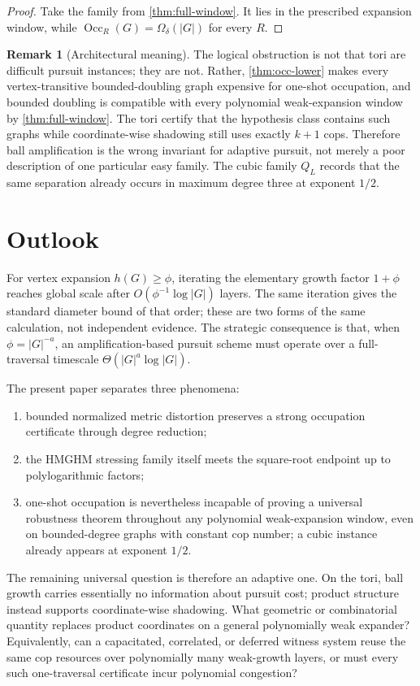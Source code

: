 \documentclass[11pt]{amsart}
\theoremstyle{definition}
\newtheorem{remark}[theorem]{Remark}
\newcommand{\Occ}{\operatorname{Occ}}
\begin{document}
\begin{proof}
Take the family from \cref{thm:full-window}.  It lies in the prescribed
expansion window, while $\Occ_R(G)=\Omega_\delta(|G|)$ for every $R$.
\end{proof}

\begin{remark}[Architectural meaning]
The logical obstruction is not that tori are difficult pursuit instances;
they are not.  Rather, \cref{thm:occ-lower} makes every vertex-transitive
bounded-doubling graph expensive for one-shot occupation, and bounded
doubling is compatible with every polynomial weak-expansion window by
\cref{thm:full-window}.  The tori
certify that the hypothesis class contains such graphs while coordinate-wise
shadowing still uses exactly $k+1$ cops.  Therefore ball amplification is the
wrong invariant for adaptive pursuit, not merely a poor description of one
particular easy family.  The cubic family $Q_L$ records that the same
separation already occurs in maximum degree three at exponent $1/2$.
\end{remark}

\section{Outlook}

For vertex expansion $h(G)\ge\phi$, iterating the elementary growth factor
$1+\phi$ reaches global scale after $O(\phi^{-1}\log |G|)$ layers.  The same
iteration gives the standard diameter bound of that order; these are two
forms of the same calculation, not independent evidence.  The strategic
consequence is that, when $\phi=|G|^{-a}$, an amplification-based pursuit
scheme must operate over a full-traversal timescale $\Theta(|G|^a\log|G|)$.

The present paper separates three phenomena:
\begin{enumerate}[label=\textup{(\arabic*)}]
\item bounded normalized metric distortion preserves a strong occupation
certificate through degree reduction;
\item the HMGHM stressing family itself meets the square-root endpoint up to
polylogarithmic factors;
\item one-shot occupation is nevertheless incapable of proving a universal
robustness theorem throughout any polynomial weak-expansion window, even on
bounded-degree graphs with constant cop number; a cubic instance already
appears at exponent $1/2$.
\end{enumerate}
The remaining universal question is therefore an adaptive one.  On the tori,
ball growth carries essentially no information about pursuit cost; product
structure instead supports coordinate-wise shadowing.  What geometric or
combinatorial quantity replaces product coordinates on a general
polynomially weak expander?  Equivalently, can a capacitated, correlated, or
deferred witness system reuse the same cop resources over polynomially many
weak-growth layers, or must every such one-traversal certificate incur
polynomial congestion?
\end{document}

